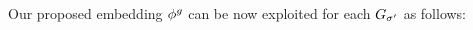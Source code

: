 Our proposed embedding ${\phi^{g}}$ \cite{Bergami21} can be now exploited for each  $G_{\sigma'}$ as follows:


